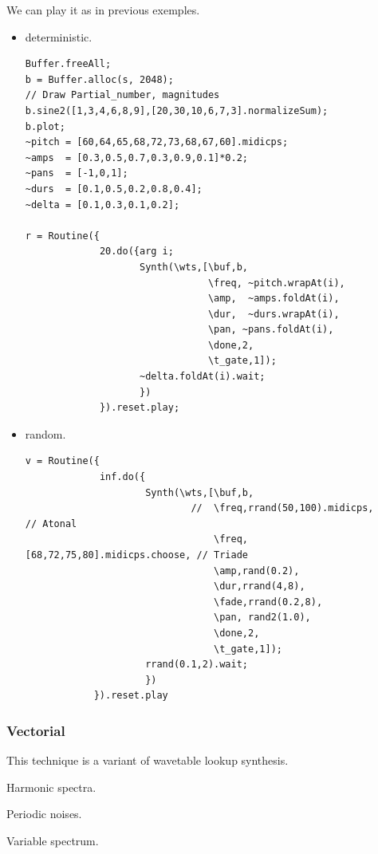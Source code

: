We can play it as in previous exemples.

\begin{itemize}
\tightlist
\item deterministic.
\begin{lstlisting}[frame=single] 
Buffer.freeAll;
b = Buffer.alloc(s, 2048);
// Draw Partial_number, magnitudes
b.sine2([1,3,4,6,8,9],[20,30,10,6,7,3].normalizeSum);  
b.plot; 
~pitch = [60,64,65,68,72,73,68,67,60].midicps;
~amps  = [0.3,0.5,0.7,0.3,0.9,0.1]*0.2;
~pans  = [-1,0,1];
~durs  = [0.1,0.5,0.2,0.8,0.4];
~delta = [0.1,0.3,0.1,0.2];

r = Routine({
             20.do({arg i;
                    Synth(\wts,[\buf,b,
			                    \freq, ~pitch.wrapAt(i),
			                    \amp,  ~amps.foldAt(i),
			                    \dur,  ~durs.wrapAt(i),
			                    \pan, ~pans.foldAt(i),
			                    \done,2,
			                    \t_gate,1]); 
                    ~delta.foldAt(i).wait;        
                    })
             }).reset.play;
\end{lstlisting}

\item random.
\begin{lstlisting}[frame=single] 
v = Routine({
	         inf.do({
                     Synth(\wts,[\buf,b,
			                 //  \freq,rrand(50,100).midicps,         // Atonal
			                     \freq, [68,72,75,80].midicps.choose, // Triade
			                     \amp,rand(0.2), 
			                     \dur,rrand(4,8),
			                     \fade,rrand(0.2,8),
			                     \pan, rand2(1.0),
			                     \done,2,
			                     \t_gate,1]);
			         rrand(0.1,2).wait;
			         })
            }).reset.play
\end{lstlisting}
\end{itemize}

\subsubsection{Vectorial}\label{vectorial}

This technique is a variant of wavetable lookup synthesis.

Harmonic spectra.  

Periodic noises.

Variable spectrum.


